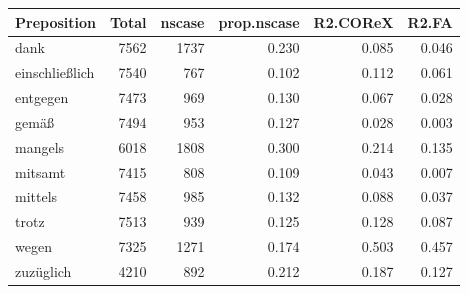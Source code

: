 \begin{table}
  \begin{tabular}{lrrrrr}
  \toprule
            Preposition  & Total  & nscase & prop.nscase & R2.COReX & R2.FA \\
  \midrule
            dank  & 7562   & 1737   & 0.230    & 0.085   & 0.046  \\
  einschließlich  & 7540   &  767   & 0.102    & 0.112   & 0.061 \\
        entgegen  & 7473   &  969   & 0.130    & 0.067   & 0.028 \\
           gemäß  & 7494   &  953   & 0.127    & 0.028   & 0.003 \\
         mangels  & 6018   & 1808   & 0.300    & 0.214   & 0.135 \\
         mitsamt  & 7415   &  808   & 0.109    & 0.043   & 0.007 \\
         mittels  & 7458   &  985   & 0.132    & 0.088   & 0.037 \\
           trotz  & 7513   &  939   & 0.125    & 0.128   & 0.087 \\
           wegen  & 7325   & 1271   & 0.174    & 0.503   & 0.457 \\
       zuzüglich  & 4210   &  892   & 0.212    & 0.187   & 0.127  \\
  \bottomrule
  \end{tabular}
\end{table}


